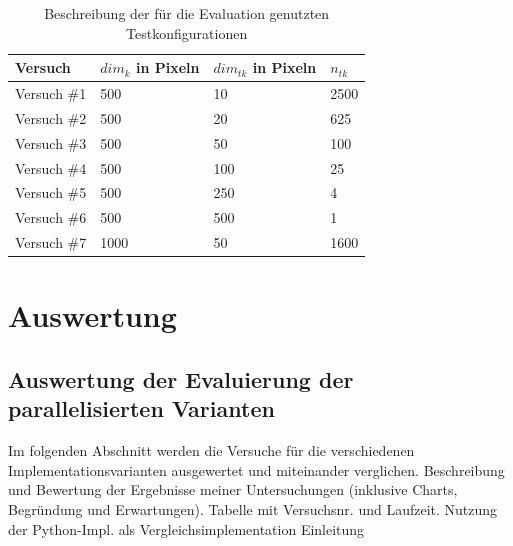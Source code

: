 \begin{table}[position specifier]
          \centering
          \begin{tabular}{| p{2cm} | p{3cm} | p{3cm} | p{3cm} |}
          	\hline
                  Versuch & $dim_k$ in Pixeln & $dim_{tk}$ in Pixeln & $n_{tk}$ \\
                  \hline
                  Versuch \#1 & 500 & 10 & 2500 \\
                  \hline
                  Versuch \#2 & 500 & 20 & 625 \\
                  \hline
                  Versuch \#3 & 500 & 50 & 100 \\
                  \hline
                  Versuch \#4 & 500 & 100 & 25 \\
                  \hline
                  Versuch \#5 & 500 & 250 & 4 \\
                  \hline
                  Versuch \#6 & 500 & 500 & 1 \\
                  \hline
                  Versuch \#7 & 1000 & 50 & 1600 \\
                  \hline

          \end{tabular}
          \caption{Beschreibung der für die Evaluation genutzten Testkonfigurationen}
          \label{tab:descriptionTestSetting}
\end{table}


\section{Auswertung}
\subsection{Auswertung der Evaluierung der parallelisierten Varianten}
Im folgenden Abschnitt werden die Versuche für die verschiedenen Implementationsvarianten ausgewertet und miteinander verglichen.  
Beschreibung und Bewertung der Ergebnisse meiner Untersuchungen (inklusive Charts, Begründung und Erwartungen). Tabelle mit Versuchsnr. und  Laufzeit. Nutzung der Python-Impl. als Vergleichsimplementation
Einleitung

